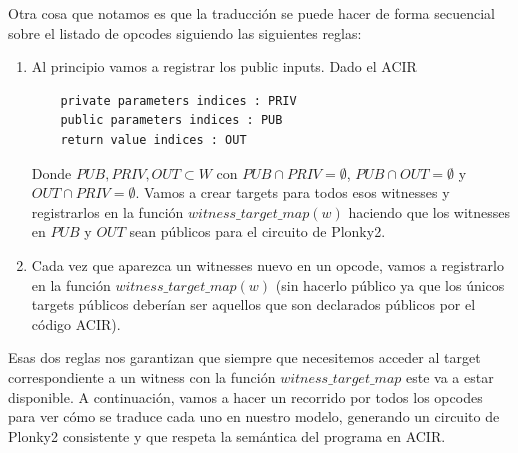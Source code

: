 Otra cosa que notamos es que la traducción se puede hacer de forma secuencial sobre el listado de opcodes siguiendo las siguientes reglas:
\begin{enumerate}
    \item Al principio vamos a registrar los public inputs. Dado el ACIR 
    \begin{verbatim}
    private parameters indices : PRIV
    public parameters indices : PUB
    return value indices : OUT
    \end{verbatim}
    Donde $PUB,PRIV,OUT \subset W$ con $PUB\cap PRIV = \emptyset$, $PUB\cap OUT = \emptyset$ y $OUT\cap PRIV = \emptyset$. Vamos a crear targets para todos esos witnesses y registrarlos en la función $witness\_target\_map(w)$ haciendo que los witnesses en $PUB$ y $OUT$ sean públicos para el circuito de Plonky2. 

    \item Cada vez que aparezca un witnesses nuevo en un opcode, vamos a registrarlo en la función $witness\_target\_map(w)$ (sin hacerlo público ya que los únicos targets públicos deberían ser aquellos que son declarados públicos por el código ACIR).
\end{enumerate}
Esas dos reglas nos garantizan que siempre que necesitemos acceder al target correspondiente a un witness con la función $witness\_target\_map$ este va a estar disponible. A continuación, vamos a hacer un recorrido por todos los opcodes para ver cómo se traduce cada uno en nuestro modelo, generando un circuito de Plonky2 consistente y que respeta la semántica del programa en ACIR. 

